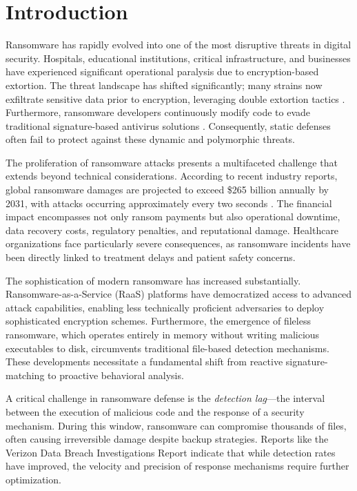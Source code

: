 \section{Introduction}

Ransomware has rapidly evolved into one of the most disruptive threats in digital security. Hospitals, educational institutions, critical infrastructure, and businesses have experienced significant operational paralysis due to encryption-based extortion. The threat landscape has shifted significantly; many strains now exfiltrate sensitive data prior to encryption, leveraging double extortion tactics \cite{moussaileb2021survey}. Furthermore, ransomware developers continuously modify code to evade traditional signature-based antivirus solutions \cite{kharraz2016unveil}. Consequently, static defenses often fail to protect against these dynamic and polymorphic threats.



The proliferation of ransomware attacks presents a multifaceted challenge that extends beyond technical considerations. According to recent industry reports, global ransomware damages are projected to exceed \$265 billion annually by 2031, with attacks occurring approximately every two seconds \cite{verizon2025}. The financial impact encompasses not only ransom payments but also operational downtime, data recovery costs, regulatory penalties, and reputational damage. Healthcare organizations face particularly severe consequences, as ransomware incidents have been directly linked to treatment delays and patient safety concerns.

The sophistication of modern ransomware has increased substantially. Ransomware-as-a-Service (RaaS) platforms have democratized access to advanced attack capabilities, enabling less technically proficient adversaries to deploy sophisticated encryption schemes. Furthermore, the emergence of fileless ransomware, which operates entirely in memory without writing malicious executables to disk, circumvents traditional file-based detection mechanisms. These developments necessitate a fundamental shift from reactive signature-matching to proactive behavioral analysis.


A critical challenge in ransomware defense is the \emph{detection lag}—the interval between the execution of malicious code and the response of a security mechanism. During this window, ransomware can compromise thousands of files, often causing irreversible damage despite backup strategies. Reports like the Verizon Data Breach Investigations Report \cite{verizon2025} indicate that while detection rates have improved, the velocity and precision of response mechanisms require further optimization.

